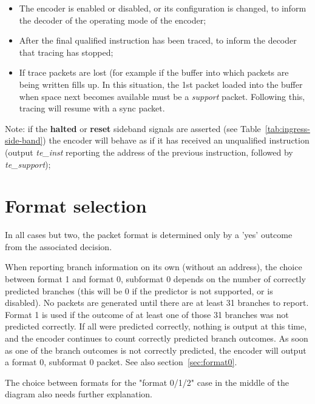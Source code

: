 \begin{itemize}
  \item The encoder is enabled or disabled, or its configuration is changed, 
    to inform the decoder of the operating mode of the encoder;
  \item After the final qualified instruction has been traced, to inform the decoder that 
    tracing has stopped;
  \item If trace packets are lost (for example if the buffer into which packets are being 
    written fills up.  In this situation, the 1st packet 
    loaded into the buffer when space next becomes available must be a \textit{support} 
    packet.  Following this, tracing will resume with a sync packet.
\end{itemize}

Note: if the \textbf{halted} or \textbf{reset} sideband signals are asserted (see Table~\ref{tab:ingress-side-band})
the encoder will behave as if it has received an unqualified instruction (output \textit{te\_inst}
reporting the address of the previous instruction, followed by \textit{te\_support});


\section{Format selection} \label{format-selection}

In all cases but two, the packet format is determined only by a 'yes' outcome from the 
associated decision.  

When reporting branch information on its own (without an address), the choice between format 1 and format 0, 
subformat 0 depends on the number of correctly predicted branches (this will be 0 if the predictor is not 
supported, or is disabled).  No packets are generated until there are at least 31 branches to report.  
Format 1 is used if the outcome of at least one of those 31 branches was not predicted correctly.  If all were 
predicted correctly, nothing is output at this time, and the encoder continues to count correctly predicted
branch outcomes.  As soon as one of the branch outcomes is not correctly predicted, the encoder will output
a format 0, subformat 0 packet.  See also section~\ref{sec:format0}.

The choice between formats for the "format 0/1/2" case in the middle of the diagram also needs further 
explanation.  


